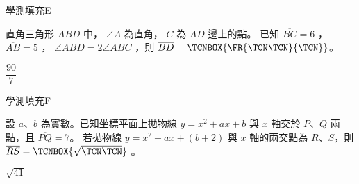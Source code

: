 \begin{QUESTIONS}
    \begin{QUESTION}
        \begin{ExamInfo}{99}{學測}{填充}{E}
        \end{ExamInfo}
        \begin{ExamAnsRateInfo}{31}{75}{17}{1}
        \end{ExamAnsRateInfo}
        \begin{QBODY}
            直角三角形 $ABD$ 中， $\angle A$ 為直角， $C$ 為 $AD$ 邊上的點。
			已知 $\overline{BC} = 6$ ， $\overline{AB} = 5$ ， $\angle ABD = 2 \angle ABC$ ，則 $\overline{BD} = \TCNBOX{\FR{\TCN\TCN}{\TCN}}$。
        \end{QBODY}
        \begin{QFROMS}
        \end{QFROMS}
        \begin{QTAGS}\end{QTAGS}
        \begin{QANS}
            $\dfrac{90}{7}$
        \end{QANS}
        \begin{QSOLLIST}
        \end{QSOLLIST}
        \begin{QEMPTYSPACE}
        \end{QEMPTYSPACE}
    \end{QUESTION}
    \begin{QUESTION}
        \begin{ExamInfo}{99}{學測}{填充}{F}
        \end{ExamInfo}
        \begin{ExamAnsRateInfo}{15}{40}{4}{1}
        \end{ExamAnsRateInfo}
        \begin{QBODY}
            設 $a$、$b$ 為實數。已知坐標平面上拋物線 $y=x^2 +ax+b$ 與 $x$ 軸交於 $P$、$Q$ 兩點，且 $\overline{PQ}=7$。 若拋物線 $y=x^2 +ax+(b+2)$ 與 $x$ 軸的兩交點為 $R$、$S$，則 $\overline{RS}=\TCNBOX{\sqrt{\TCN\TCN}}$ 。
        \end{QBODY}
        \begin{QFROMS}
        \end{QFROMS}
        \begin{QTAGS}\end{QTAGS}
        \begin{QANS}
            $\sqrt{41}$
        \end{QANS}

\end{QUESTION}
\end{QUESTIONS}
